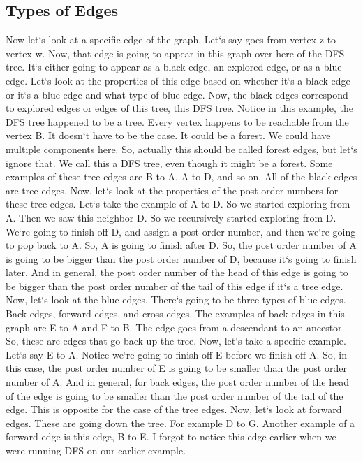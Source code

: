 \subsection{Types of Edges}
Now let`s look at a specific edge of the graph.
Let`s say goes from vertex z to vertex w.
Now, that edge is going to appear in this graph over here of the DFS tree.
It`s either going to appear as a black edge, an explored edge, or as a blue edge.
Let`s look at the properties of this edge based on whether it`s a black edge or it`s a blue edge and what type of blue edge.
Now, the black edges correspond to explored edges or edges of this tree, this DFS tree.
Notice in this example, the DFS tree happened to be a tree.
Every vertex happens to be reachable from the vertex B\@.
It doesn`t have to be the case.
It could be a forest.
We could have multiple components here.
So, actually this should be called forest edges, but let`s ignore that.
We call this a DFS tree, even though it might be a forest.
Some examples of these tree edges are B to A, A to D, and so on.
All of the black edges are tree edges.
Now, let`s look at the properties of the post order numbers for these tree edges.
Let`s take the example of A to D\@.
So we started exploring from A\@.
Then we saw this neighbor D\@.
So we recursively started exploring from D\@.
We`re going to finish off D, and assign a post order number, and then we`re going to pop back to A\@.
So, A is going to finish after D\@.
So, the post order number of A is going to be bigger than the post order number of D, because it`s going to finish later.
And in general, the post order number of the head of this edge is going to be bigger than the post order number of the tail of this edge if it`s a tree edge.
Now, let`s look at the blue edges.
There`s going to be three types of blue edges.
Back edges, forward edges, and cross edges.
The examples of back edges in this graph are E to A and F to B\@.
The edge goes from a descendant to an ancestor.
So, these are edges that go back up the tree.
Now, let`s take a specific example.
Let`s say E to A\@.
Notice we`re going to finish off E before we finish off A\@.
So, in this case, the post order number of E is going to be smaller than the post order number of A\@.
And in general, for back edges, the post order number of the head of the edge is going to be smaller than the post order number of the tail of the edge.
This is opposite for the case of the tree edges.
Now, let`s look at forward edges.
These are going down the tree.
For example D to G\@.
Another example of a forward edge is this edge, B to E\@.
I forgot to notice this edge earlier when we were running DFS on our earlier example.
